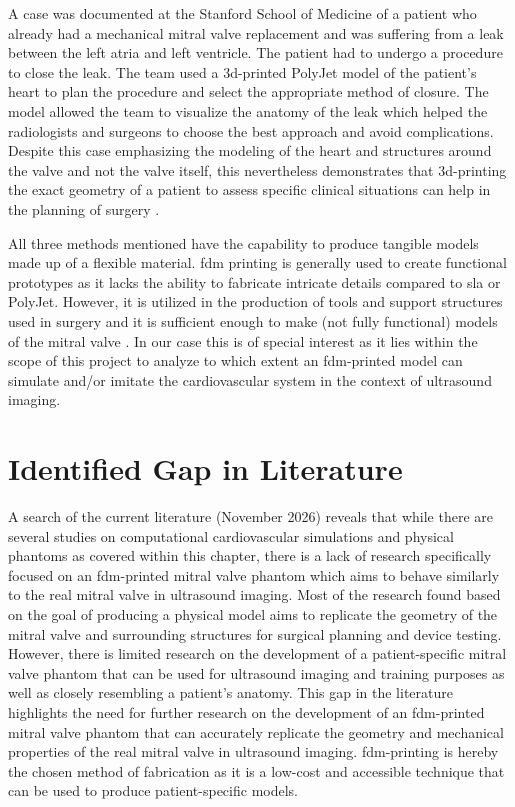 A case was documented at the Stanford School of Medicine of a patient who already had a mechanical mitral valve replacement and was suffering from a leak between the left atria and left ventricle. The patient had to undergo a procedure to close the leak. The team used a \gls{3d}-printed PolyJet model of the patient's heart to plan the procedure and select the appropriate method of closure. The model allowed the team to visualize the anatomy of the leak which helped the radiologists and surgeons to choose the best approach and avoid complications. Despite this case emphasizing the modeling of the heart and structures around the valve and not the valve itself, this nevertheless demonstrates that \gls{3d}-printing the exact geometry of a patient to assess specific clinical situations can help in the planning of surgery \cite{stanford3dqlabMitralValve}. 

All three methods mentioned have the capability to produce tangible models made up of a flexible material. \Gls{fdm} printing is generally used to create functional prototypes as it lacks the ability to fabricate intricate details compared to \gls{sla} or PolyJet. However, it is utilized in the production of tools and support structures used in surgery and it is sufficient enough to make (not fully functional) models of the mitral valve \cite{pavlykova20263d}. In our case this is of special interest as it lies within the scope of this project to analyze to which extent an \gls{fdm}-printed model can simulate and/or imitate the cardiovascular system in the context of ultrasound imaging.

\section{Identified Gap in Literature}\label{sec:gap_in_literature}
A search of the current literature (November 2026) reveals that while there are several studies on computational cardiovascular simulations and physical phantoms as covered within this chapter, there is a lack of research specifically focused on an \gls{fdm}-printed mitral valve phantom which aims to behave similarly to the real mitral valve in ultrasound imaging. Most of the research found based on the goal of producing a physical model aims to replicate the geometry of the mitral valve and surrounding structures for surgical planning and device testing. However, there is limited research on the development of a patient-specific mitral valve phantom that can be used for ultrasound imaging and training purposes as well as closely resembling a patient's anatomy. This gap in the literature highlights the need for further research on the development of an \gls{fdm}-printed mitral valve phantom that can accurately replicate the geometry and mechanical properties of the real mitral valve in ultrasound imaging. \Gls{fdm}-printing is hereby the chosen method of fabrication as it is a low-cost and accessible technique that can be used to produce patient-specific models.


